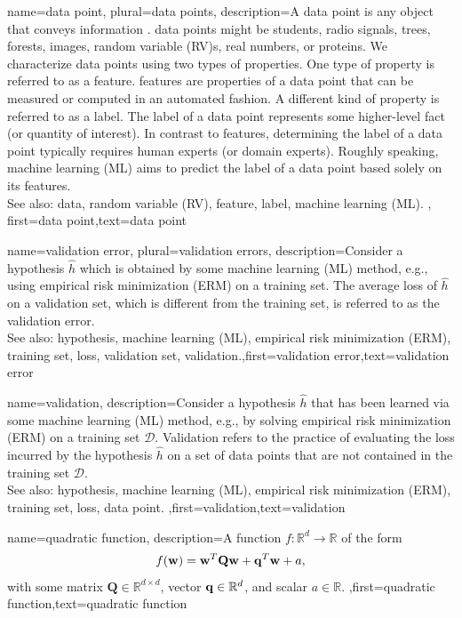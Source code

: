 {name={data point}, plural={data points},
description={A data point is any object that conveys information \cite{coverthomas}. \Gls{data} points might be 
		students, radio signals, trees, forests, images, random variable (RV)s, real numbers, or proteins. We characterize data points 
		using two types of properties. One type of property is referred to as a feature. \Glspl{feature} are properties of a 
		data point that can be measured or computed in an automated fashion. 
		A different kind of property is referred to as a label. The label of 
		a data point represents some higher-level fact (or quantity of interest). In 
		contrast to features, determining the label of a data point typically 
		requires human experts (or domain experts). Roughly speaking, machine learning (ML) aims to predict 
		the label of a data point based solely on its features. 
				\\
		See also: data, random variable (RV), feature, label, machine learning (ML).
		}, first={data point},text={data point}  
}


{name={validation error}, plural={validation errors},
 description={Consider a hypothesis $\hat{h}$ which is 
 	obtained by some machine learning (ML) method, e.g., using empirical risk minimization (ERM) on a training set. The average loss 
 	of $\hat{h}$ on a validation set, which is different from the training set, is referred 
 	to as the validation error.
			\\
		See also: hypothesis, machine learning (ML), empirical risk minimization (ERM), training set, loss, validation set, validation.},first={validation error},text={validation error}  
}

{name={validation},
	description={Consider a hypothesis $\hat{h}$ that has been 
		learned via some machine learning (ML) method, e.g., by solving empirical risk minimization (ERM) on a training set $\mathcal{D}$. 
		Validation refers to the practice of evaluating the loss incurred by the 
		hypothesis $\hat{h}$ on a set of 
		data points that are not contained in the training set $\mathcal{D}$.
				\\
		See also: hypothesis, machine learning (ML), empirical risk minimization (ERM), training set, loss, data point. },first={validation},text={validation}  
}

{name={quadratic function},
	description={A function $f: \mathbb{R}^{d} \rightarrow \mathbb{R}$ of the form 
	$$f({\bf w}) =  {\bf w}^{T} \mathbf{Q} \mathbf{w} + \mathbf{q}^{T} {\bf w}+a,$$ with 
	some matrix $\mathbf{Q} \in \mathbb{R}^{d \times d}$, vector ${\bf q} \in \mathbb{R}^{d}$, 
	and scalar $a \in \mathbb{R}$. },first={quadratic function},text={quadratic function}  
}

